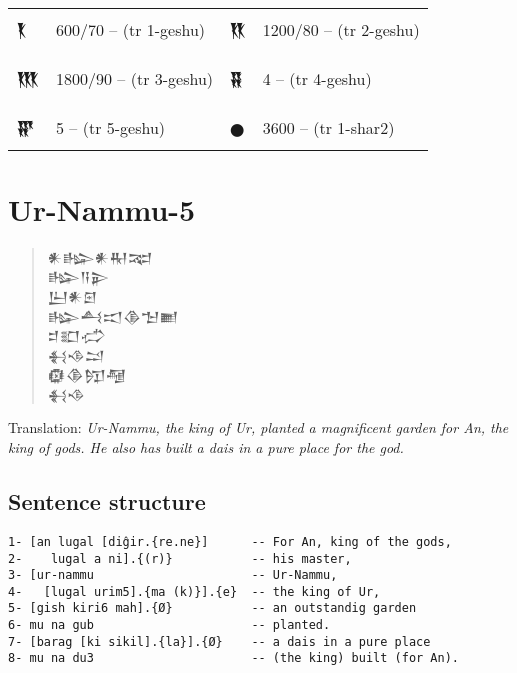 \documentclass[a4paper,12pt]{book}
\newcommand{\fcm}{\large\setmainfont{Akkadian.otf}}
\newcommand{\fsm}{\Large\setmainfont{Akkadian.otf}}
\begin{document}
\verb||\\
\begin{tabular}[!h]{l l | l l|}
  {\fcm 𒐞}      & 600/70 -- (tr 1-geshu)
  & {\fcm 𒐟}     & 1200/80 -- (tr 2-geshu)\\
 &&&\\
 {\fcm 𒐠}      &  1800/90 -- (tr 3-geshu) 
 & {\fcm 𒐡}   & 4 -- (tr 4-geshu)\\
&&&\\
 {\fcm 𒐢}   & 5 -- (tr 5-geshu)
 &  {\fcm 𒊹}   &  3600 -- (tr 1-shar2)  \\
 \end{tabular}


\chapter{Ur-Nammu-5}
\begin{quotation}
{\fsm 𒀭𒈗𒀭𒊑𒉈} \\
    
{\fsm 𒈗𒀀𒉌} \\

{\fsm 𒌨𒀭𒇉} \\

{\fsm 𒈗𒋀𒀊𒆠𒈠𒆤} \\

{\fsm 𒄑𒊬𒈤} \\

{\fsm 𒈬𒈾𒁺} \\

{\fsm 𒁈𒆠𒂖𒆷} \\

{\fsm 𒈬𒈾} 
\end{quotation}
Translation:
{\em Ur-Nammu, the king of Ur, planted a magnificent
  garden for An, the king of gods. He also has built
  a dais in a pure place for the god.}

\newpage
\section{Sentence structure}
\begin{verbatim}
1- [an lugal [diĝir.{re.ne}]      -- For An, king of the gods,
2-    lugal a ni].{(r)}           -- his master,
3- [ur-nammu                      -- Ur-Nammu,
4-   [lugal urim5].{ma (k)}].{e}  -- the king of Ur,
5- [gish kiri6 mah].{Ø}           -- an outstandig garden
6- mu na gub                      -- planted.
7- [barag [ki sikil].{la}].{Ø}    -- a dais in a pure place
8- mu na du3                      -- (the king) built (for An).
\end{verbatim}
\end{document}
